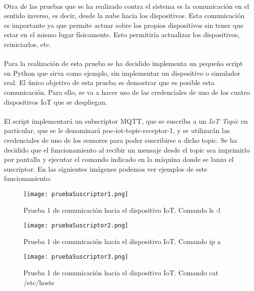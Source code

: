 \documentclass[../../memoria.tex]{subfiles}
\begin{document}
\paragraph{}
Otra de las pruebas que se ha realizado contra el sistema es la comunicación en el sentido inverso, es decir, desde la nube hacia los dispositivos. Esta comunicación es importante ya que permite actuar sobre los propios dispositivos sin tener que estar en el mismo lugar físicamente. Esto permitiría actualizar los dispositivos, reiniciarlos, etc.

\paragraph{}
Para la realización de esta prueba se ha decidido implementa un pequeño script en Python que sirva como ejemplo, sin implementar un dispositivo o simulador real. El único objetivo de esta prueba es demostrar que es posible esta comunicación. Para ello, se va a hacer uso de las credenciales de uno de los cuatro dispositivos IoT que se despliegan.

\paragraph{}
El script implementará un subscriptor MQTT, que se suscriba a un \textit{IoT Topic} en particular, que se le denominará poc-iot-topic-receptor-1, y se utilizarán las credenciales de uno de los sensores para poder suscribirse a dicho topic. Se ha decidido que el funcionamiento al recibir un mensaje desde el topic sea imprimirlo por pantalla y ejecutar el comando indicado en la máquina donde se lanza el suscriptor. En las siguientes imágenes podemos ver ejemplos de este funcionamiento:

\begin{figure}[H]
    \centering
    \texttt{[image: pruebaSuscriptor1.png]}
    \caption{Prueba 1 de comunicación hacia el dispositivo IoT. Comando ls -l}
    \label{fig:pruebaSuscriptor1}
\end{figure}

\begin{figure}[H]
    \centering
    \texttt{[image: pruebaSuscriptor2.png]}
    \caption{Prueba 1 de comunicación hacia el dispositivo IoT. Comando ip a}
    \label{fig:pruebaSuscriptor2}
\end{figure}

\begin{figure}[H]
    \centering
    \texttt{[image: pruebaSuscriptor3.png]}
    \caption{Prueba 1 de comunicación hacia el dispositivo IoT. Comando cat /etc/hosts}
    \label{fig:pruebaSuscriptor3}
\end{figure}
\end{document}
